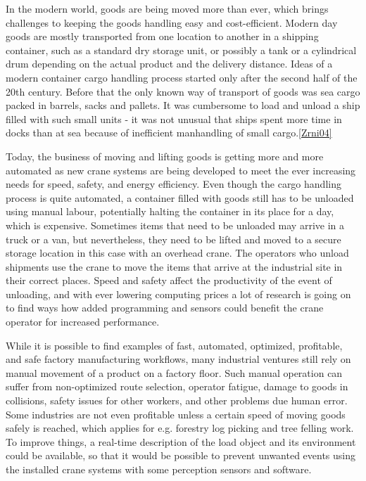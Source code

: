 \documentclass[12pt,a4paper,oneside,pdftex]{report}
\begin{document}
In the modern world, goods are being moved more than ever, which brings challenges to keeping the goods handling easy and cost-efficient. Modern day goods are mostly transported from one location to another in a shipping container, such as a standard dry storage unit, or possibly a tank or a cylindrical drum depending on the actual product and the delivery distance. 
Ideas of a modern container cargo handling process started only after the second half of the 20th century. Before that the only known way of transport of goods was sea cargo packed in barrels, sacks and pallets. It was cumbersome to load and unload a ship filled with such small units - it was not unusual that ships spent more time in docks than at sea because of inefficient manhandling of small cargo.\ref{Zrni04}\par

Today, the business of moving and lifting goods is getting more and more automated as new crane systems are being developed to meet the ever increasing needs for speed, safety, and energy efficiency. Even though the cargo handling process is quite automated, a container filled with goods still has to be unloaded using manual labour, potentially halting the container in its place for a day, which is expensive. Sometimes items that need to be unloaded may arrive in a truck or a van, but nevertheless, they need to be lifted and moved to a secure storage location in this case with an overhead crane. The operators who unload shipments use the crane to move the items that arrive at the industrial site in their correct places. Speed and safety affect the productivity of the event of unloading, and with ever lowering computing prices a lot of research is going on to find ways how added programming and sensors could benefit the crane operator for increased performance.\par

While it is possible to find examples of fast, automated, optimized, profitable, and safe factory manufacturing workflows, many industrial ventures still rely on manual movement of a product on a factory floor. Such manual operation can suffer from non-optimized route selection, operator fatigue, damage to goods in collisions, safety issues for other workers, and other problems due human error. Some industries are not even profitable unless a certain speed of moving goods safely is reached, which applies for e.g. forestry log picking and tree felling work. To improve things, a real-time description of the load object and its environment could be available, so that it would be possible to prevent unwanted events using the installed crane systems with some perception sensors and software.
\end{document}
